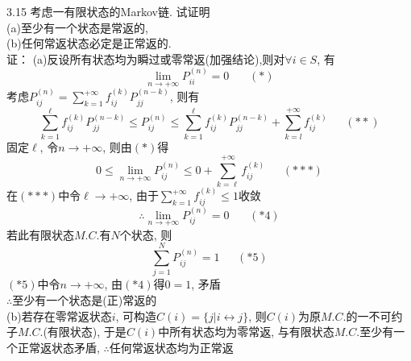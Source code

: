 3.15 考虑一有限状态的Markov链. 试证明\\
(a)至少有一个状态是常返的,\\
(b)任何常返状态必定是正常返的.\\
证：
(a)反设所有状态均为瞬过或零常返(加强结论),则对$\forall i \in S$, 有
	\[
	\lim_{n\rightarrow +\infty} P^{(n)}_{ii} = 0~~~~~~~~(*)
	\]
	考虑$P^{(n)}_{ij} = \sum\limits^{+\infty}_{k=1} f^{(k)}_{ij} P^{(n-k)}_{jj}$, 则有
	\[
	\sum^\ell_{k=1} f^{(k)}_{ij} P^{(n-k)}_{jj} \leqslant P^{(n)}_{ij} \leqslant \sum^\ell_{k=1} f^{(k)}_{ij} P^{(n-k)}_{jj} + \sum^{+\infty}_{k=l} f^{(k)}_{ij}~~~~~~~(**)
	\]
	固定$\ell$, 令$n \rightarrow +\infty$, 则由$(*)$得
	\[
	0 \leqslant \lim_{n\rightarrow +\infty} P^{(n)}_{ij} \leqslant 0 + \sum^{+\infty}_{k=\ell} f^{(k)}_{ij}~~~~~~~(***)
	\]
	在$(***)$中令$\ell \rightarrow +\infty$, 由于$\sum\limits^{+\infty}_{k=1} f^{(k)}_{ij} \leqslant 1$收敛\\
	\[
	\therefore \lim_{n\rightarrow +\infty} P^{(n)}_{ij} = 0 ~~~~~~~~(*4)
	\]
	若此有限状态$M.C.$有$N$个状态, 则
	\[
	\sum^{N}_{j=1} P^{(n)}_{ij} = 1~~~~~~~(*5)
	\]
	$(*5)$中令$n\rightarrow +\infty$, 由$(*4)$得$0=1$, 矛盾\\
	$\therefore$至少有一个状态是(正)常返的\\
(b)若存在零常返状态$i$, 可构造$C(i) = \{j|i\leftrightarrow j\}$,
	则$C(i)$为原$M.C.$的一不可约子$M.C.$(有限状态),
	于是$C(i)$中所有状态均为零常返, 与有限状态$M.C.$至少有一个正常返状态矛盾, $\therefore$任何常返状态均为正常返


